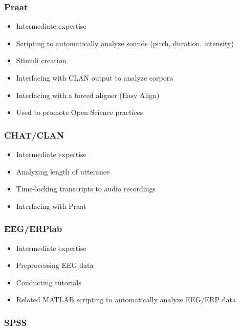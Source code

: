 \documentclass[10pt,a4paper,]{article}
\providecommand{\tightlist}{%
  \setlength{\itemsep}{0pt}\setlength{\parskip}{0pt}}
\begin{document}
\hypertarget{praat}{%
\subsubsection{Praat}\label{praat}}

\begin{itemize}
\tightlist
\item
  Intermediate expertise
\item
  Scripting to automatically analyze sounds (pitch, duration, intensity)
\item
  Stimuli creation
\item
  Interfacing with CLAN output to analyze corpora
\item
  Interfacing with a forced aligner (Easy Align)
\item
  Used to promote Open Science practices
\end{itemize}

\hypertarget{chatclan}{%
\subsubsection{CHAT/CLAN}\label{chatclan}}

\begin{itemize}
\tightlist
\item
  Intermediate expertise
\item
  Analyzing length of utterance
\item
  Time-locking transcripts to audio recordings
\item
  Interfacing with Praat
\end{itemize}

\hypertarget{eegerplab}{%
\subsubsection{EEG/ERPlab}\label{eegerplab}}

\begin{itemize}
\tightlist
\item
  Intermediate expertise
\item
  Preprocessing EEG data
\item
  Conducting tutorials
\item
  Related MATLAB scripting to automatically analyze EEG/ERP data
\end{itemize}

\hypertarget{spss}{%
\subsubsection{SPSS}\label{spss}}
\end{document}
